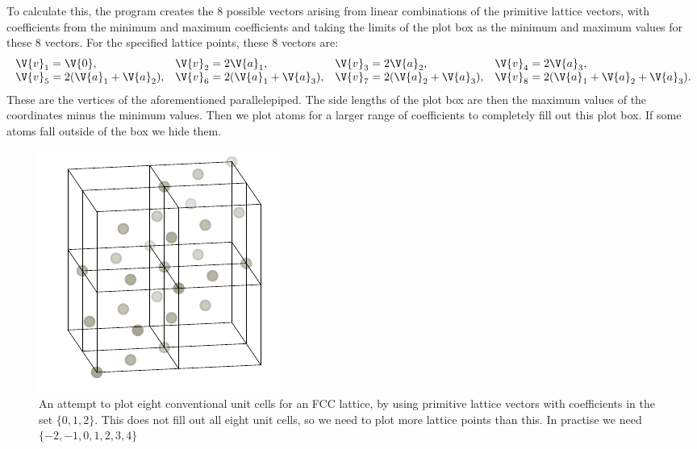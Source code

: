 \documentclass[main.tex]{subfiles}
\begin{document}
	To calculate this, the program creates the 8 possible vectors arising from linear combinations of the primitive lattice vectors, with coefficients from the minimum and maximum coefficients and taking the limits of the plot box as the minimum and maximum values for these 8 vectors. For the specified lattice points, these 8 vectors are:
	\begin{equation}
		\begin{array}{llll}
			\V{v}_1 = \V{0}, & \V{v}_2 = 2\V{a}_1, & \V{v}_3 = 2\V{a}_2, & \V{v}_4 = 2\V{a}_3, \\
			\V{v}_5 = 2(\V{a}_1+\V{a}_2), & \V{v}_6 = 2(\V{a}_1+\V{a}_3), & \V{v}_7 = 2(\V{a}_2+\V{a}_3), &\V{v}_8 = 2(\V{a}_1+\V{a}_2+ \V{a}_3).
		\end{array}
	\end{equation}
	These are the vertices of the aforementioned parallelepiped. The side lengths of the plot box are then the maximum values of the coordinates minus the minimum values. Then we plot atoms for a larger range of coefficients to completely fill out this plot box. If some atoms fall outside of the box we hide them.
	
	\begin{figure}
		\begin{center}
			\includegraphics[width=\linewidth]{figures/lattice_unfinished_2.pdf}
		\end{center}
		\caption{An attempt to plot eight conventional unit cells for an FCC lattice, by using primitive lattice vectors with coefficients in the set $ \{0, 1, 2\} $. This does not fill out all eight unit cells, so we need to plot more lattice points than this. In practise we need $ \{-2, -1, 0, 1, 2, 3, 4\} $}
		\label{fig:lattice_unfinished_2}
	\end{figure}
	
\end{document}
